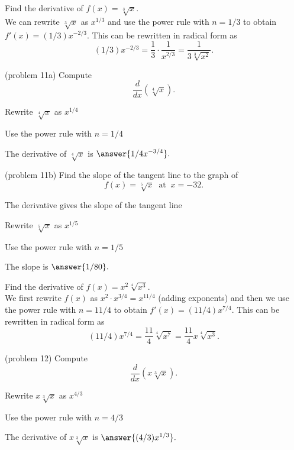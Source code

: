 \documentclass{ximera}
\begin{document}
\begin{example}[example 11]
Find the derivative of $f(x) = \sqrt[3] x$.\\
We can rewrite $\sqrt[3] x$ as $x^{1/3}$ and use the power rule with $n = 1/3$ to obtain
$f'(x) = (1/3)x^{-2/3}$.  This can be rewritten in radical form as 
\[(1/3)x^{-2/3} = \frac{1}{3}\cdot \frac{1}{x^{2/3}} = \frac{1}{3\sqrt[3] {x^2}}.\]
\end{example}




\begin{problem}(problem 11a)
Compute
\[
\frac{d}{dx} \left(\sqrt[4] x\right).
\]
\begin{hint}
Rewrite $\sqrt[4] x$ as $x^{1/4}$
\end{hint}
\begin{hint}
Use the power rule with $n = 1/4$
\end{hint}
The derivative of $\sqrt[4] x$ is $\answer{1/4 x^{-3/4}}.$
\end{problem}



\begin{problem}(problem 11b)
Find the slope of the tangent line to the graph of 
\[
f(x) = \sqrt[5] x  \;\; \text{at} \;\; x = -32.
\]

\begin{hint}
The derivative gives the slope of the tangent line
\end{hint}
\begin{hint}
Rewrite $\sqrt[5] x$ as $x^{1/5}$
\end{hint}
\begin{hint}
Use the power rule with $n = 1/5$
\end{hint}
The slope is  $\answer{1/80}.$
\end{problem}



\begin{example}[example 12]
Find the derivative of $f(x) = x^2\sqrt[4] {x^3}$.\\
We first rewrite $f(x)$ 
as $x^2 \cdot x^{3/4} = x^{11/4}$ (adding exponents) and then we use the power rule with $n = 11/4$
to obtain $f'(x) = (11/4)x^{7/4}$. This can be rewritten in radical form as 
\[(11/4)x^{7/4}  = \frac{11}{4} \sqrt[4] {x^7} = \frac{11}{4} x\sqrt[4] {x^3} .\]
\end{example}



\begin{problem}(problem 12)
Compute
\[
\frac{d}{dx} \left(x\sqrt[3] x\right).
\]
\begin{hint}
Rewrite $x\sqrt[3] x$ as $x^{4/3}$
\end{hint}
\begin{hint}
Use the power rule with $n = 4/3$
\end{hint}
The derivative of $x\sqrt[3] x$ is $\answer{(4/3) x^{1/3}}.$
\end{problem}
\end{document}
